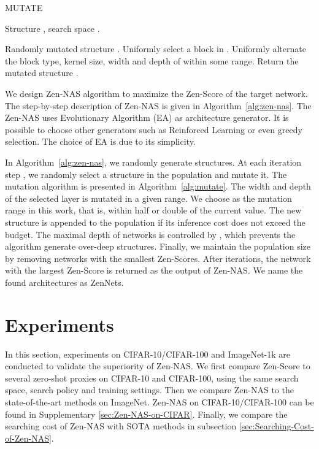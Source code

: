 \documentclass{article}
\providecommand{\citep}{\cite}
\begin{document}
\begin{algorithm}
 \caption{MUTATE}
 \label{alg:mutate}
\begin{algorithmic}[1]

\REQUIRE Structure , search space . 

\ENSURE Randomly mutated structure .
\STATE Uniformly select a block  in .
\STATE Uniformly alternate the block type, kernel size, width and depth of  within some range.
\STATE Return the mutated structure .
\end{algorithmic}
\end{algorithm}

We design Zen-NAS algorithm to maximize the Zen-Score of the target network. The step-by-step description of Zen-NAS is given in Algorithm~\ref{alg:zen-nas}. The Zen-NAS uses Evolutionary Algorithm (EA) as architecture generator. It is possible to choose other generators such as Reinforced Learning or even greedy selection. The choice of EA is due to its simplicity.

In Algorithm~\ref{alg:zen-nas}, we randomly generate  structures. At each iteration step , we randomly select a structure in the population  and mutate it. The mutation algorithm is presented in Algorithm~\ref{alg:mutate}. The width and depth of the selected layer is mutated in a given range. We choose  as the mutation range in this work, that is, within half or double of the current value. The new structure  is appended to the population if its inference cost does not exceed the budget. The maximal depth of networks is controlled by , which prevents the algorithm generate over-deep structures. Finally, we maintain the population size by removing  networks with the smallest Zen-Scores. After  iterations, the network with the largest Zen-Score is returned as the output of Zen-NAS. We name the found architectures as ZenNets.



\section{Experiments}
\label{sec:experiment}

In this section, experiments on CIFAR-10/CIFAR-100 \citep{krizhevskyLearningMultipleLayers2009} and ImageNet-1k \citep{dengImageNetLargescaleHierarchical2009} are conducted to validate the superiority of Zen-NAS. We first compare Zen-Score to several zero-shot proxies on CIFAR-10 and CIFAR-100, using the same search space,  search policy and training settings. Then we compare Zen-NAS to the state-of-the-art methods on ImageNet. Zen-NAS on CIFAR-10/CIFAR-100 can be found in Supplementary \ref{sec:Zen-NAS-on-CIFAR}. Finally, we compare the searching cost of Zen-NAS with SOTA methods in subsection \ref{sec:Searching-Cost-of-Zen-NAS}. 
\end{document}

